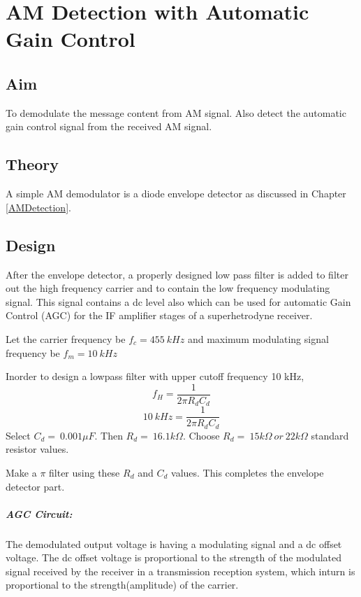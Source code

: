 \chapter[AM Detection with Automatic Gain Control]{AM Detection with Automatic Gain Control}
\section*{Aim}
To demodulate the message content from AM signal. Also detect the automatic gain control signal from the received AM signal.
\section*{Theory}
A simple AM demodulator is a diode envelope detector as discussed in  Chapter \ref{AMDetection}.
\section*{Design}After the envelope detector, a properly designed low pass filter is added to filter out the high frequency carrier and to contain the low frequency modulating signal. This signal contains a dc level also which can be used for automatic Gain Control (AGC) for the IF amplifier stages of a superhetrodyne receiver.

Let the carrier frequency be $f_c=455\ kHz$ and maximum modulating signal frequency be $f_m=10\ kHz$

Inorder to design a lowpass filter with upper cutoff frequency 10 kHz,
\begin{equation}
f_H=\frac{1}{2\pi R_dC_d}
\end{equation}
\begin{equation}
10\ kHz=\frac{1}{2\pi R_dC_d}
\end{equation}
\noindent Select $C_d=\ 0.001 \mu F$. Then $R_d=\ 16.1k\Omega$.
Choose $R_d=\ 15k\Omega \ or\ 22k\Omega$ standard resistor values.

Make a $\pi$ filter using these $R_d$ and $C_d$ values. This completes the envelope detector part.
\paragraph{AGC Circuit:} The demodulated output voltage is having a modulating signal and a dc offset voltage. The dc offset voltage is proportional to the strength of the modulated signal received by the receiver in a transmission reception system, which inturn is proportional to the strength(amplitude) of the carrier.

